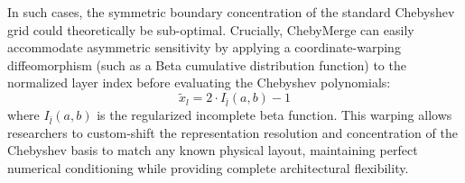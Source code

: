 In such cases, the symmetric boundary concentration of the standard Chebyshev grid could theoretically be sub-optimal. Crucially, ChebyMerge can easily accommodate asymmetric sensitivity by applying a coordinate-warping diffeomorphism (such as a Beta cumulative distribution function) to the normalized layer index before evaluating the Chebyshev polynomials:
\begin{equation}
\tilde{x}_l = 2 \cdot I_{\bar{l}}(a, b) - 1
\end{equation}
where $I_{\bar{l}}(a, b)$ is the regularized incomplete beta function. This warping allows researchers to custom-shift the representation resolution and concentration of the Chebyshev basis to match any known physical layout, maintaining perfect numerical conditioning while providing complete architectural flexibility.

